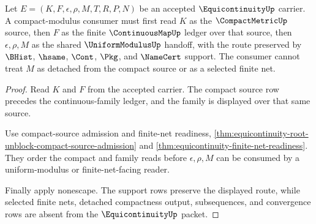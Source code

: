 \begin{theorem}
\label{thm:equicontinuity-root-unblock-compact-modulus-consumer}
Let $E=(K,F,\epsilon,\rho,M,T,R,P,N)$ be an accepted $\EquicontinuityUp$ carrier. A compact-modulus consumer must first read $K$ as the $\CompactMetricUp$ source, then $F$ as the finite $\ContinuousMapUp$ ledger over that source, then $\epsilon,\rho,M$ as the shared $\UniformModulusUp$ handoff, with the route preserved by $\BHist$, $\hsame$, $\Cont$, $\Pkg$, and $\NameCert$ support. The consumer cannot treat $M$ as detached from the compact source or as a selected finite net.
\end{theorem}
\begin{proof}
Read $K$ and $F$ from the accepted carrier. The compact source row precedes the continuous-family ledger, and the family is displayed over that same source.

Use compact-source admission and finite-net readiness, \autoref{thm:equicontinuity-root-unblock-compact-source-admission} and \autoref{thm:equicontinuity-finite-net-readiness}. They order the compact and family reads before $\epsilon,\rho,M$ can be consumed by a uniform-modulus or finite-net-facing reader.

Finally apply nonescape. The support rows preserve the displayed route, while selected finite nets, detached compactness output, subsequences, and convergence rows are absent from the $\EquicontinuityUp$ packet.
\end{proof}

